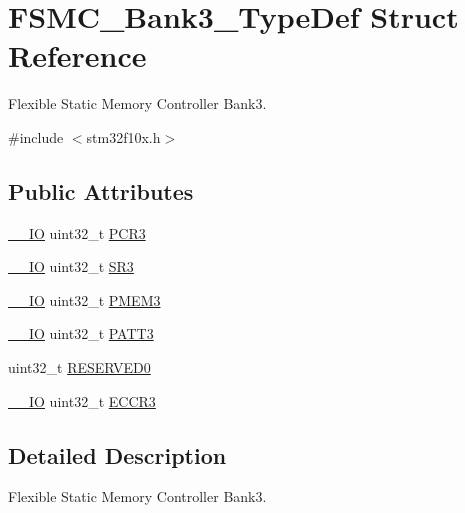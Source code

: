 \hypertarget{struct_f_s_m_c___bank3___type_def}{}\section{F\+S\+M\+C\+\_\+\+Bank3\+\_\+\+Type\+Def Struct Reference}
\label{struct_f_s_m_c___bank3___type_def}


Flexible Static Memory Controller Bank3.  




{\ttfamily \#include $<$stm32f10x.\+h$>$}

\subsection*{Public Attributes}
\begin{DoxyCompactItemize}
\item 
\hyperlink{core__sc300_8h_aec43007d9998a0a0e01faede4133d6be}{\+\_\+\+\_\+\+IO} uint32\+\_\+t \hyperlink{struct_f_s_m_c___bank3___type_def_a1f772e1028641cab7b923bf02115b919}{P\+C\+R3}
\item 
\hyperlink{core__sc300_8h_aec43007d9998a0a0e01faede4133d6be}{\+\_\+\+\_\+\+IO} uint32\+\_\+t \hyperlink{struct_f_s_m_c___bank3___type_def_ab89f16f64018a1f1e55d36f92b84be94}{S\+R3}
\item 
\hyperlink{core__sc300_8h_aec43007d9998a0a0e01faede4133d6be}{\+\_\+\+\_\+\+IO} uint32\+\_\+t \hyperlink{struct_f_s_m_c___bank3___type_def_a756258d9266b1eee3455bc850107beb6}{P\+M\+E\+M3}
\item 
\hyperlink{core__sc300_8h_aec43007d9998a0a0e01faede4133d6be}{\+\_\+\+\_\+\+IO} uint32\+\_\+t \hyperlink{struct_f_s_m_c___bank3___type_def_a0cbf1b4647f98914238202828de47416}{P\+A\+T\+T3}
\item 
uint32\+\_\+t \hyperlink{struct_f_s_m_c___bank3___type_def_a2e9cac528ee7bfce11b0b9a36db3b954}{R\+E\+S\+E\+R\+V\+E\+D0}
\item 
\hyperlink{core__sc300_8h_aec43007d9998a0a0e01faede4133d6be}{\+\_\+\+\_\+\+IO} uint32\+\_\+t \hyperlink{struct_f_s_m_c___bank3___type_def_a6935beb5bbc2de668024c1989eecd46c}{E\+C\+C\+R3}
\end{DoxyCompactItemize}


\subsection{Detailed Description}
Flexible Static Memory Controller Bank3. 

